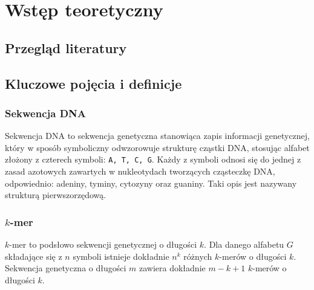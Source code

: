 \cleardoublepage
\section{Wstęp teoretyczny}

    \subsection{Przegląd literatury}


    \subsection{Kluczowe pojęcia i definicje}

        \subsubsection{Sekwencja DNA}

        Sekwencja DNA to sekwencja genetyczna stanowiąca zapis informacji genetycznej, który w sposób symboliczny odwzorowuje strukturę cząstki DNA, stosując alfabet złożony z czterech symboli: \texttt{A, T, C, G}. Każdy z symboli odnosi się do jednej z zasad azotowych zawartych w nukleotydach tworzących cząsteczkę DNA, odpowiednio: adeniny, tyminy, cytozyny oraz guaniny.
        Taki opis jest nazywany strukturą pierwszorzędową.

        \subsubsection{$k$-mer}

            $k$-mer to podsłowo sekwencji genetycznej o długości $k$. Dla danego alfabetu $G$ składające się z $n$ symboli istnieje dokładnie $n^k$ różnych $k$-merów o długości $k$. Sekwencja genetyczna o długości $m$ zawiera dokładnie $m - k + 1$ $k$-merów o długości $k$.


